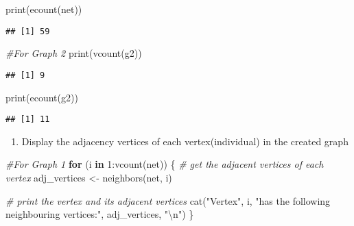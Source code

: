 \documentclass[
]{article}
\newenvironment{Shaded}{\begin{snugshade}}{\end{snugshade}}
\newcommand{\CommentTok}[1]{\textcolor[rgb]{0.56,0.35,0.01}{\textit{#1}}}
\newcommand{\ControlFlowTok}[1]{\textcolor[rgb]{0.13,0.29,0.53}{\textbf{#1}}}
\newcommand{\DecValTok}[1]{\textcolor[rgb]{0.00,0.00,0.81}{#1}}
\newcommand{\FunctionTok}[1]{\textcolor[rgb]{0.00,0.00,0.00}{#1}}
\newcommand{\NormalTok}[1]{#1}
\newcommand{\OtherTok}[1]{\textcolor[rgb]{0.56,0.35,0.01}{#1}}
\newcommand{\SpecialCharTok}[1]{\textcolor[rgb]{0.00,0.00,0.00}{#1}}
\newcommand{\StringTok}[1]{\textcolor[rgb]{0.31,0.60,0.02}{#1}}
\providecommand{\tightlist}{%
  \setlength{\itemsep}{0pt}\setlength{\parskip}{0pt}}
\begin{document}
\begin{Shaded}
\begin{Highlighting}[]
\FunctionTok{print}\NormalTok{(}\FunctionTok{ecount}\NormalTok{(net))}
\end{Highlighting}
\end{Shaded}

\begin{verbatim}
## [1] 59
\end{verbatim}

\begin{Shaded}
\begin{Highlighting}[]
\CommentTok{\#For Graph 2}
\FunctionTok{print}\NormalTok{(}\FunctionTok{vcount}\NormalTok{(g2))}
\end{Highlighting}
\end{Shaded}

\begin{verbatim}
## [1] 9
\end{verbatim}

\begin{Shaded}
\begin{Highlighting}[]
\FunctionTok{print}\NormalTok{(}\FunctionTok{ecount}\NormalTok{(g2))}
\end{Highlighting}
\end{Shaded}

\begin{verbatim}
## [1] 11
\end{verbatim}

\begin{enumerate}
\def\labelenumi{\arabic{enumi}.}
\setcounter{enumi}{4}
\tightlist
\item
  Display the adjacency vertices of each vertex(individual) in the
  created graph
\end{enumerate}

\begin{Shaded}
\begin{Highlighting}[]
\CommentTok{\#For Graph 1}
\ControlFlowTok{for}\NormalTok{ (i }\ControlFlowTok{in} \DecValTok{1}\SpecialCharTok{:}\FunctionTok{vcount}\NormalTok{(net)) \{}
  \CommentTok{\# get the adjacent vertices of each vertex}
\NormalTok{  adj\_vertices }\OtherTok{\textless{}{-}} \FunctionTok{neighbors}\NormalTok{(net, i)}
  
  \CommentTok{\# print the vertex and its adjacent vertices}
  \FunctionTok{cat}\NormalTok{(}\StringTok{"Vertex"}\NormalTok{, i, }\StringTok{"has the following neighbouring vertices:"}\NormalTok{, adj\_vertices, }\StringTok{"}\SpecialCharTok{\textbackslash{}n}\StringTok{"}\NormalTok{)}
\NormalTok{\}}
\end{Highlighting}
\end{Shaded}
\end{document}
